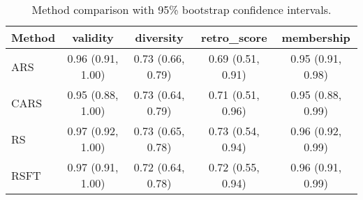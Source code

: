 \begin{table}[t]
\centering
\caption{Method comparison with 95\% bootstrap confidence intervals.}
\label{tab:method_comparison}
\small
\begin{tabular}{lcccc}
\toprule
Method & validity & diversity & retro_score & membership \\
\midrule
ARS & 0.96 (0.91, 1.00) & 0.73 (0.66, 0.79) & 0.69 (0.51, 0.91) & 0.95 (0.91, 0.98) \\
CARS & 0.95 (0.88, 1.00) & 0.73 (0.64, 0.79) & 0.71 (0.51, 0.96) & 0.95 (0.88, 0.99) \\
RS & 0.97 (0.92, 1.00) & 0.73 (0.65, 0.78) & 0.73 (0.54, 0.94) & 0.96 (0.92, 0.99) \\
RSFT & 0.97 (0.91, 1.00) & 0.72 (0.64, 0.78) & 0.72 (0.55, 0.94) & 0.96 (0.91, 0.99) \\
\bottomrule
\end{tabular}
\end{table}

